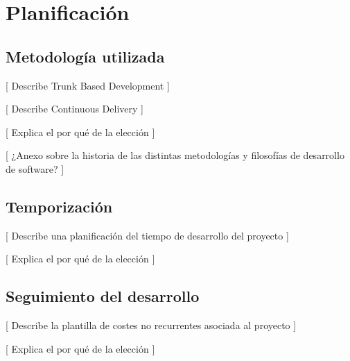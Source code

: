 \chapter{Planificación}

\section{Metodología utilizada}

[ Describe Trunk Based Development ]

[ Describe Continuous Delivery ]

[ Explica el por qué de la elección ]

[ ¿Anexo sobre la historia de las distintas metodologías y
filosofías de desarrollo de software? ]

\section{Temporización}

[ Describe una planificación del tiempo de desarrollo del proyecto ]

[ Explica el por qué de la elección ]

\section{Seguimiento del desarrollo}

[ Describe la plantilla de costes no recurrentes asociada al proyecto ]

[ Explica el por qué de la elección ]
